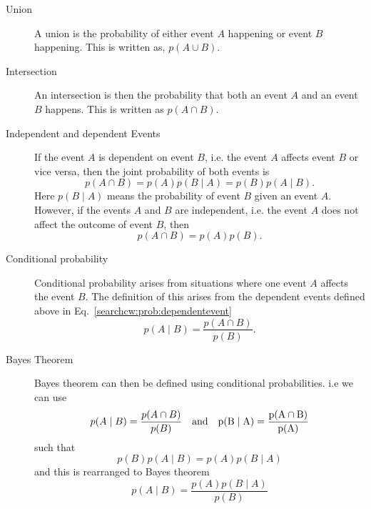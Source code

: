 \begin{description}
	\item [Union]
	A union is the probability of either event $A$ happening or event $B$ happening. This is written as, $p(A \cup B)$.
	
	\item [Intersection]
	An intersection is then the probability that both an event $A$ and an event $B$ happens. This is written as $p(A \cap B)$.
	
	\item [Independent and dependent Events]
	If the event $A$ is dependent on event $B$, i.e. the event $A$ affects event $B$ or vice versa, then the joint probability of both events is
	\begin{equation}
	\label{searchcw:prob:dependentevent}
	p(A \cap B) = p(A)p(B \mid A) = p(B)p(A \mid B).
	\end{equation}
	Here $p(B \mid A)$ means the probability of event $B$ given an event $A$.
	However, if the events $A$ and $B$ are independent, i.e. the event $A$ does not affect the outcome of event $B$, then
	\begin{equation}
	p(A \cap B) = p(A)p(B).
	\end{equation}
	
	
	\item [Conditional probability]
	Conditional probability arises from situations where one event $A$ affects the event $B$.
	The definition of this arises from the dependent events defined above in Eq.~\ref{searchcw:prob:dependentevent}
	\begin{equation}
	p(A \mid B) = \frac{p(A \cap B)}{p(B)}.
	\end{equation}
	
	\item [Bayes Theorem]
	Bayes theorem can then be defined using conditional probabilities. i.e we can use
	\begin{equation}
	p(A \mid B) = \frac{p(A \cap B)}{p(B)} \quad \rm{and} \quad p(B \mid A) = \frac{p(A \cap B)}{p(A)}
	\end{equation}
	such that
	\begin{equation}
	p(B)p(A \mid B) = p(A)p(B \mid A)
	\end{equation}
	and this is rearranged to Bayes theorem
	\begin{equation}
	\label{searchcw:prob:bayes}
	p(A \mid B) = \frac{p(A)p(B \mid A)}{p(B)}
	\end{equation}
	
\end{description}

